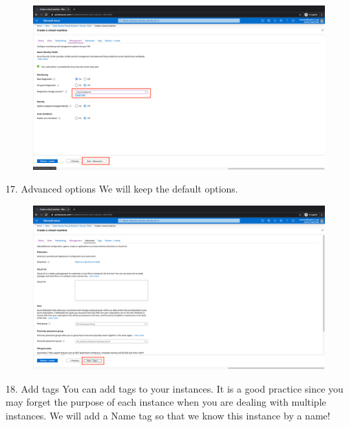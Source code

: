 \begin{figure}[H]
\begin{center} 
\includegraphics[scale=0.20]{figures/vm20}
\end{center}
\end{figure}

17. Advanced options
We will keep the default options.

\begin{figure}[H]
\begin{center} 
\includegraphics[scale=0.20]{figures/vm21}
\end{center}
\end{figure}

18. Add tags
You can add tags to your instances. It is a good practice since you may forget the purpose of each instance when you are dealing with multiple instances. We will add a Name tag so that we know this instance by a name!

